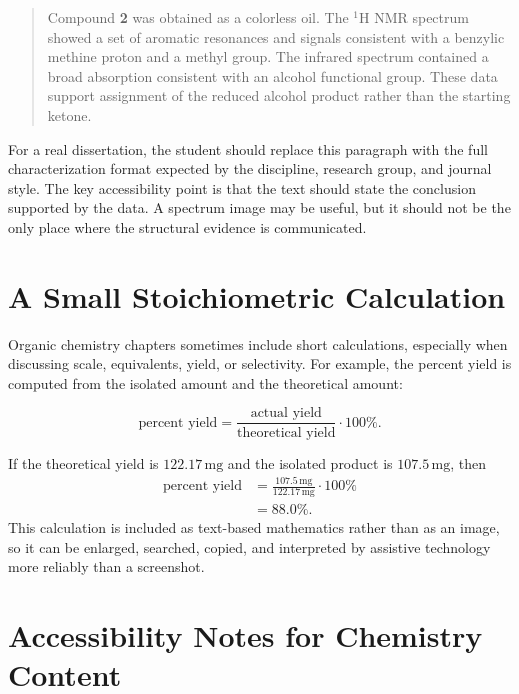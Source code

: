 \begin{quote}
Compound \textbf{2} was obtained as a colorless oil. The \({}^{1}\mathrm{H}\) NMR spectrum showed a set of aromatic resonances and signals consistent with a benzylic methine proton and a methyl group. The infrared spectrum contained a broad absorption consistent with an alcohol functional group. These data support assignment of the reduced alcohol product rather than the starting ketone.
\end{quote}

For a real dissertation, the student should replace this paragraph with the full characterization format expected by the discipline, research group, and journal style. The key accessibility point is that the text should state the conclusion supported by the data. A spectrum image may be useful, but it should not be the only place where the structural evidence is communicated.

\section{A Small Stoichiometric Calculation}
\label{sec:stoichiometric-calculation}

Organic chemistry chapters sometimes include short calculations, especially when discussing scale, equivalents, yield, or selectivity. For example, the percent yield is computed from the isolated amount and the theoretical amount:

\begin{equation}
\text{percent yield}=\frac{\text{actual yield}}{\text{theoretical yield}}\cdot 100\%.
\label{eq:percent-yield}
\end{equation}

If the theoretical yield is \(122.17\,\mathrm{mg}\) and the isolated product is \(107.5\,\mathrm{mg}\), then
\begin{align}
\text{percent yield}
  &= \frac{107.5\,\mathrm{mg}}{122.17\,\mathrm{mg}}\cdot 100\% \\
  &= 88.0\%.
\label{eq:percent-yield-example}
\end{align}
This calculation is included as text-based mathematics rather than as an image, so it can be enlarged, searched, copied, and interpreted by assistive technology more reliably than a screenshot.

\section{Accessibility Notes for Chemistry Content}
\label{sec:chemistry-accessibility-notes}

